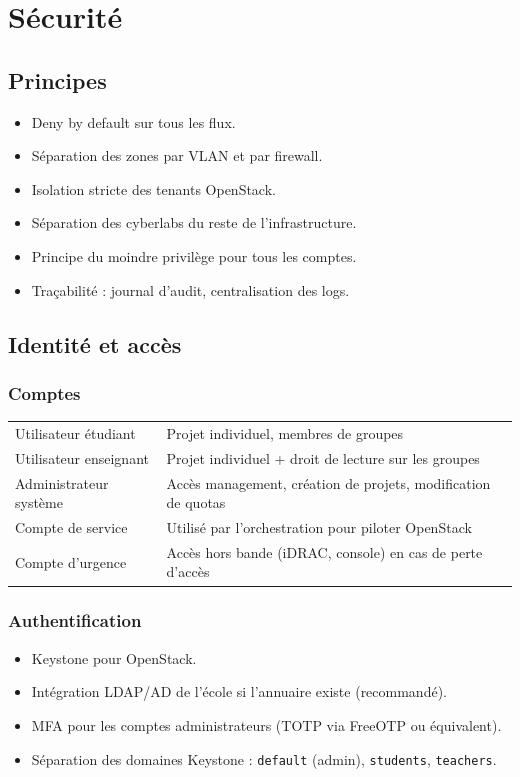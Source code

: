 \chapter{Sécurité}
\label{chap:securite}

\section{Principes}
\begin{itemize}
  \item Deny by default sur tous les flux.
  \item Séparation des zones par VLAN et par firewall.
  \item Isolation stricte des tenants OpenStack.
  \item Séparation des cyberlabs du reste de l'infrastructure.
  \item Principe du moindre privilège pour tous les comptes.
  \item Traçabilité : journal d'audit, centralisation des logs.
\end{itemize}

\section{Identité et accès}
\subsection{Comptes}
\begin{xltabular}{\textwidth}{@{}lX@{}}
\toprule
{} &  \\
\midrule
\endhead
\bottomrule
\endfoot
\bottomrule
\endlastfoot
Utilisateur étudiant & Projet individuel, membres de groupes \\
Utilisateur enseignant & Projet individuel + droit de lecture sur les groupes \\
Administrateur système & Accès management, création de projets, modification de quotas \\
Compte de service & Utilisé par l'orchestration pour piloter OpenStack \\
Compte d'urgence & Accès hors bande (iDRAC, console) en cas de perte d'accès \\

\end{xltabular}

\subsection{Authentification}
\begin{itemize}
  \item Keystone pour OpenStack.
  \item Intégration LDAP/AD de l'école si l'annuaire existe (recommandé).
  \item MFA pour les comptes administrateurs (TOTP via FreeOTP ou équivalent).
  \item Séparation des domaines Keystone : \texttt{default} (admin), \texttt{students}, \texttt{teachers}.
\end{itemize}

